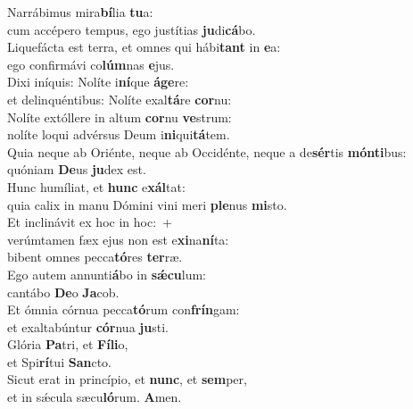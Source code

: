 \evenverse Narrábimus mira\textbf{bí}lia \textbf{tu}a:~\*\\
\evenverse cum accépero tempus, ego justítias \textbf{ju}di\textbf{cá}bo.\\
\oddverse Liquefácta est terra, et omnes qui hábi\textbf{tant} in \textbf{e}a:~\*\\
\oddverse ego confirmávi co\textbf{lúm}nas \textbf{e}jus.\\
\evenverse Dixi iníquis: Nolíte i\textbf{ní}que \textbf{á}\textbf{ge}re:~\*\\
\evenverse et delinquéntibus: Nolíte exal\textbf{tá}re \textbf{cor}nu:\\
\oddverse Nolíte extóllere in altum \textbf{cor}nu \textbf{ve}strum:~\*\\
\oddverse nolíte loqui advérsus Deum i\textbf{ni}qui\textbf{tá}tem.\\
\evenverse Quia neque ab Oriénte, neque ab Occidénte, neque a de\textbf{sér}tis \textbf{món}\textbf{ti}bus:~\*\\
\evenverse quóniam \textbf{De}us \textbf{ju}dex est.\\
\oddverse Hunc humíliat, et \textbf{hunc} e\textbf{xál}tat:~\*\\
\oddverse quia calix in manu Dómini vini meri \textbf{ple}nus \textbf{mi}sto.\\
\evenverse Et inclinávit ex hoc in hoc:~+\\
\evenverse  verúmtamen fæx ejus non est e\textbf{xi}na\textbf{ní}ta:~\*\\
\evenverse bibent omnes pecca\textbf{tó}res \textbf{ter}ræ.\\
\oddverse Ego autem annunti\textbf{á}bo in \textbf{sǽ}\textbf{cu}lum:~\*\\
\oddverse cantábo \textbf{De}o \textbf{Ja}cob.\\
\evenverse Et ómnia córnua pecca\textbf{tó}rum con\textbf{frín}gam:~\*\\
\evenverse et exaltabúntur \textbf{cór}nua \textbf{ju}sti.\\
\oddverse Glória \textbf{Pa}tri, et \textbf{Fí}\textbf{li}o,~\*\\
\oddverse et Spi\textbf{rí}tui \textbf{San}cto.\\
\evenverse Sicut erat in princípio, et \textbf{nunc}, et \textbf{sem}per,~\*\\
\evenverse et in sǽcula sæcu\textbf{ló}rum. \textbf{A}men.\\
